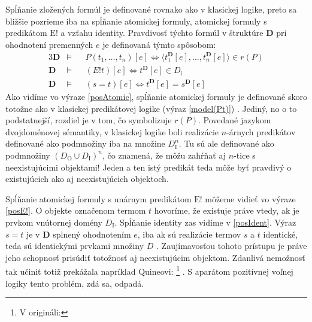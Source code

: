 \documentclass[12pt, letterpaper]{article}
\begin{document}
Spĺňanie zložených formúl je definované rovnako ako v klasickej logike, preto sa bližšie pozrieme iba na spĺňanie atomickej formuly, atomickej formuly s predikátom $\text{E}!$ a vzťahu identity. Pravdivosť týchto formúl v štruktúre \textbf{D} pri ohodnotení premenných $e$ je definovaná týmto spôsobom:
\begin{alignat}{3}
    \mathbf{D} &\models&& P(t_1,\dots, t_n)[e] \iff  \langle t_{1}^{\mathbf{D}}[e],\dots, t_{n}^{\mathbf{D}}[e]\rangle \in r(P) \label{posAtomic} \\
    \mathbf{D} &\models&& (E!t)[e] \iff  t^{\mathbf{D}}[e] \in D_{\text{i}} \label{posE!}\\
	\mathbf{D} &\models&& (s=t)[e] \iff  t^{\mathbf{D}}[e] = s^{\mathbf{D}}[e] \label{posIdent}
\end{alignat}
\noindent Ako vidíme vo výraze \ref{posAtomic}, spĺňanie atomickej formuly je definované skoro totožne ako v klasickej predikátovej logike (výraz \ref{model(Pt)}) \parencites[187]{Leeb}{sep-logic-free}. Jediný, no o to podstatnejší, rozdiel je v tom, čo symbolizuje $r(P)$. Povedané jazykom dvojdoménovej sémantiky, v klasickej logike boli realizácie $n$-árnych predikátov definované ako podmnožiny iba na množine $D_{\text{I}}^n$. Tu sú ale definované ako podmnožiny $(D_{\text{O}} \cup D_{\text{I}})^n$, čo znamená, že môžu zahŕňať aj $n$-tice s neexistujúcimi objektami! Jeden a ten istý predikát teda môže byť pravdivý o existujúcich ako aj neexistujúcich objektoch.\par
Spĺňanie atomickej formuly s unárnym predikátom $\text{E}!$ môžeme vidieť vo výraze \ref{posE!}. O objekte označenom termom $t$ hovoríme, že existuje práve vtedy, ak je prvkom vnútornej domény $D_{\text{I}}$. Spĺňanie identity zas vidíme v \ref{posIdent}. Výraz $s = t$ je v \textbf{D} splnený ohodnotením $e$, iba ak sú realizácie termov $s$ a $t$ identické, teda sú identickými prvkami množiny $D$ \parencites[187]{Leeb}[13--14]{Morscher2001}{sep-logic-free}. Zaujímavosťou tohoto prístupu je práve jeho schopnosť prisúdiť totožnosť aj neexistujúcim objektom. Zdanlivá nemožnosť tak učiniť totiž prekážala napríklad Quineovi: \footnote{V origináli: } \parencites[vlastný preklad,][23--24]{quineThere}. S aparátom pozitívnej voľnej logiky tento problém, zdá sa, odpadá.\par
\end{document}
